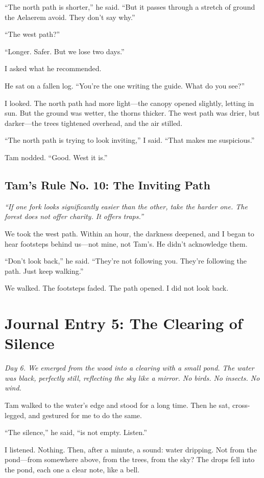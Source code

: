 \documentclass[11pt]{article}
\begin{document}
``The north path is shorter,'' he said. ``But it passes through a stretch of ground the Aelaerem avoid. They don't say why.''

``The west path?''

``Longer. Safer. But we lose two days.''

I asked what he recommended.

He sat on a fallen log. ``You're the one writing the guide. What do you see?''

I looked. The north path had more light---the canopy opened slightly, letting in sun. But the ground was wetter, the thorns thicker. The west path was drier, but darker---the trees tightened overhead, and the air stilled.

``The north path is trying to look inviting,'' I said. ``That makes me suspicious.''

Tam nodded. ``Good. West it is.''

\subsection*{Tam's Rule No. 10: The Inviting Path}
\textit{``If one fork looks significantly easier than the other, take the harder one. The forest does not offer charity. It offers traps.''}

We took the west path. Within an hour, the darkness deepened, and I began to hear footsteps behind us---not mine, not Tam's. He didn't acknowledge them.

``Don't look back,'' he said. ``They're not following you. They're following the path. Just keep walking.''

We walked. The footsteps faded. The path opened. I did not look back.

\section*{Journal Entry 5: The Clearing of Silence}
\textit{Day 6. We emerged from the wood into a clearing with a small pond. The water was black, perfectly still, reflecting the sky like a mirror. No birds. No insects. No wind.}

Tam walked to the water's edge and stood for a long time. Then he sat, cross-legged, and gestured for me to do the same.

``The silence,'' he said, ``is not empty. Listen.''

I listened. Nothing. Then, after a minute, a sound: water dripping. Not from the pond---from somewhere above, from the trees, from the sky? The drops fell into the pond, each one a clear note, like a bell.
\end{document}
